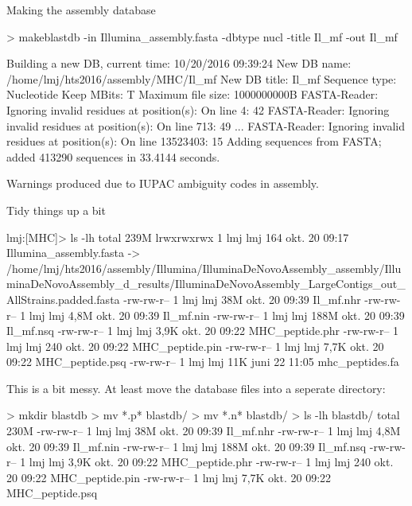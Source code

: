 \documentclass[pdf]{beamer}
\begin{document}
\begin{frame}[fragile]{Making the assembly database}
  \begin{consolecode}
    > makeblastdb -in Illumina_assembly.fasta -dbtype nucl -title Il_mf -out Il_mf

    Building a new DB, current time: 10/20/2016 09:39:24
    New DB name:   /home/lmj/hts2016/assembly/MHC/Il_mf
    New DB title:  Il_mf
    Sequence type: Nucleotide
    Keep MBits: T
    Maximum file size: 1000000000B
    FASTA-Reader: Ignoring invalid residues at position(s): On line 4: 42
    FASTA-Reader: Ignoring invalid residues at position(s): On line 713: 49
    ...
    FASTA-Reader: Ignoring invalid residues at position(s): On line 13523403: 15
    Adding sequences from FASTA; added 413290 sequences in 33.4144 seconds.
  \end{consolecode}

  \footnotesize Warnings produced due to IUPAC ambiguity codes in assembly.
\end{frame}

\begin{frame}[fragile]{Tidy things up a bit}
  \begin{consolecode}
    lmj:[MHC]> ls -lh
    total 239M
    lrwxrwxrwx 1 lmj lmj  164 okt.  20 09:17 Illumina_assembly.fasta ->
    /home/lmj/hts2016/assembly/Illumina/IlluminaDeNovoAssembly_assembly/IlluminaDeNovoAssembly_d_results/IlluminaDeNovoAssembly_LargeContigs_out_AllStrains.padded.fasta
    -rw-rw-r-- 1 lmj lmj  38M okt.  20 09:39 Il_mf.nhr
    -rw-rw-r-- 1 lmj lmj 4,8M okt.  20 09:39 Il_mf.nin
    -rw-rw-r-- 1 lmj lmj 188M okt.  20 09:39 Il_mf.nsq
    -rw-rw-r-- 1 lmj lmj 3,9K okt.  20 09:22 MHC_peptide.phr
    -rw-rw-r-- 1 lmj lmj  240 okt.  20 09:22 MHC_peptide.pin
    -rw-rw-r-- 1 lmj lmj 7,7K okt.  20 09:22 MHC_peptide.psq
    -rw-rw-r-- 1 lmj lmj  11K juni  22 11:05 mhc_peptides.fa
  \end{consolecode}
  
  \small This is a bit messy. At least move the database files into a seperate
  directory:

  \begin{consolecode}
    > mkdir blastdb
    > mv *.p* blastdb/
    > mv *.n* blastdb/
    > ls -lh blastdb/
    total 230M
    -rw-rw-r-- 1 lmj lmj  38M okt.  20 09:39 Il_mf.nhr
    -rw-rw-r-- 1 lmj lmj 4,8M okt.  20 09:39 Il_mf.nin
    -rw-rw-r-- 1 lmj lmj 188M okt.  20 09:39 Il_mf.nsq
    -rw-rw-r-- 1 lmj lmj 3,9K okt.  20 09:22 MHC_peptide.phr
    -rw-rw-r-- 1 lmj lmj  240 okt.  20 09:22 MHC_peptide.pin
    -rw-rw-r-- 1 lmj lmj 7,7K okt.  20 09:22 MHC_peptide.psq
  \end{consolecode}
\end{frame}
\end{document}
